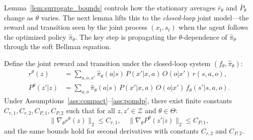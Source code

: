 \documentclass[12pt]{article}
\renewcommand{\[}{\left[}
\renewcommand{\]}{\right]}
\renewcommand{\(}{\left(}
\renewcommand{\)}{\right)}
\newcounter{l1}
\newcounter{l2}
\newcounter{l3}
\begin{document}
Lemma~\ref{lem:surrogate_bounds} controls how the stationary averages $\bar r_\theta$
and $\bar P_\theta$ change as $\theta$ varies. The next lemma lifts this to the
\emph{closed-loop} joint model---the reward and transition seen by the joint process
$(x_t, s_t)$ when the agent follows the optimized policy $\widehat\pi_\theta$.
The key step is propagating the $\theta$-dependence of $\widehat\pi_\theta$ through
the soft Bellman equation.

\begin{lemma}\label{lem:joint_bounds}
Define the joint reward and transition under the
closed-loop system $(f_\theta, \widehat\pi_\theta)$:
\begin{align*}
  r^\theta(z)
  &= \sum_{a,o,x'} \widehat\pi_\theta(a|s)\,P(x'|x,a)\,O(o|x')\,r(s,a,o),\\
  P^\theta(z'|z)
  &= \sum_{a,o} \widehat\pi_\theta(a|s)\,P(x'|x,a)\,O(o|x')\,f_\theta(s'|s,a,o).
\end{align*}
Under Assumptions~\ref{ass:compact}--\ref{ass:pomdp}, there exist finite constants $C_{r,1}, C_{r,2}, C_{P,1}, C_{P,2}$ such that for all
$z, z' \in \mathcal{Z}$ and $\theta \in \Theta$:
\begin{equation*}
  \|\nabla_\theta r^\theta(z)\|_2 \le C_{r,1},
  \quad
  \|\nabla_\theta P^\theta(z'|z)\|_2 \le C_{P,1},
\end{equation*}
and the same bounds hold for second derivatives with constants $C_{r,2}$ and $C_{P,2}$.
\end{lemma}
\end{document}
